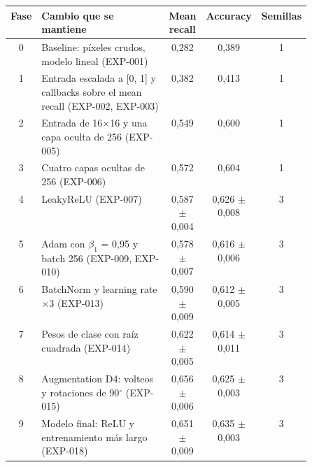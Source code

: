 \begin{tabular}{cp{0.50\linewidth}ccc}
\toprule
Fase & Cambio que se mantiene & Mean recall & Accuracy & Semillas \\
\midrule
0 & Baseline: píxeles crudos, modelo lineal (EXP-001) & 0,282 & 0,389 & 1 \\
1 & Entrada escalada a [0, 1] y callbacks sobre el mean recall (EXP-002, EXP-003) & 0,382 & 0,413 & 1 \\
2 & Entrada de 16$\times$16 y una capa oculta de 256 (EXP-005) & 0,549 & 0,600 & 1 \\
3 & Cuatro capas ocultas de 256 (EXP-006) & 0,572 & 0,604 & 1 \\
4 & LeakyReLU (EXP-007) & 0,587 $\pm$ 0,004 & 0,626 $\pm$ 0,008 & 3 \\
5 & Adam con $\beta_1$ = 0,95 y batch 256 (EXP-009, EXP-010) & 0,578 $\pm$ 0,007 & 0,616 $\pm$ 0,006 & 3 \\
6 & BatchNorm y learning rate $\times$3 (EXP-013) & 0,590 $\pm$ 0,009 & 0,612 $\pm$ 0,005 & 3 \\
7 & Pesos de clase con raíz cuadrada (EXP-014) & 0,622 $\pm$ 0,005 & 0,614 $\pm$ 0,011 & 3 \\
8 & Augmentation D4: volteos y rotaciones de 90$^\circ$ (EXP-015) & 0,656 $\pm$ 0,006 & 0,625 $\pm$ 0,003 & 3 \\
9 & Modelo final: ReLU y entrenamiento más largo (EXP-018) & 0,651 $\pm$ 0,009 & 0,635 $\pm$ 0,003 & 3 \\
\bottomrule
\end{tabular}
